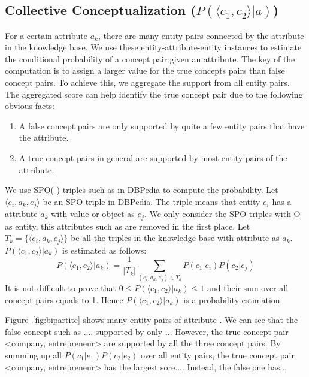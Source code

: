 \subsection{Collective Conceptualization ($P( \langle c_{1},c_{2} \rangle |a)$) }
For a certain attribute $a_k$, there are many entity pairs connected by the attribute in the knowledge base.
We use these entity-attribute-entity instances to estimate the conditional probability of a concept pair given an attribute. The key of the computation is to assign a larger value for the true concepts pairs than false concept pairs.
To achieve this, we aggregate the support from all entity pairs.
The aggregated score can help identify the true concept pair due to the following
obvious facts:
\begin{enumerate}
\item A false concept pairs are only supported by quite a few
entity pairs that have the attribute.
\item A true concept pairs in general are supported by most entity pairs of the attribute.
\end{enumerate}




We use SPO( ) triples such as   in DBPedia
to compute the probability.
Let $ \langle e_i, a_k, e_j \rangle $ be an SPO triple in DBPedia.
The triple means that entity $e_i$ has a attribute $a_k$ with value or object as $e_j$.
We only consider the SPO triples with O as entity, this attributes such as  are removed in the first place. Let $T_k=\{\langle e_i, a_k, e_j \rangle\}$ be all the triples in the knowledge base with attribute as $a_k$.
$P( \langle c_1, c_2 \rangle |a_k)$ is estimated as follows:
\begin{equation}
P(\langle c_1, c_2\rangle|a_k)= \frac{1}{|T_k|}\sum_{  (e_{i},a_k,e_{j})\in T_k } P(c_1|e_{i})P(c_2|e_{j})
\label{eq:pccga}
\end{equation}
It is not difficult to prove that $0\leq P( \langle c_1, c_2 \rangle |a_k)\leq 1$ and their sum over all concept pairs equals to 1.
Hence $P( \langle c_1, c_2 \rangle |a_k)$ is a probability estimation.

\begin{example}
\label{exa:pggga}
Figure~\ref{fig:bipartite} shows many entity pairs of attribute . We can see that
the false concept such as .... supported by only ... However, the true concept pair \ac{<company, entrepreneur>}
are supported by all the three concept pairs. By summing up all $P(c_1|e_1)P(c_2|e_2) $ over all entity pairs, the true concept pair \ac{<company, entrepreneur>} has the largest sore.... Instead, the false one has...
\end{example}


